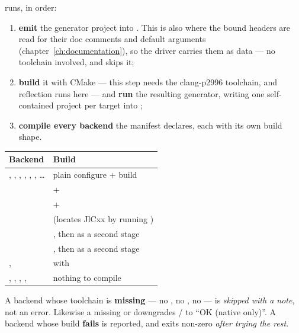runs, in order:

\begin{enumerate}
  \item \textbf{emit} the generator project into .
    This is also where the bound headers are read for their doc comments and
    default arguments (chapter~\ref{ch:documentation}), so the driver carries
    them as data --- no toolchain involved, and 
     skips it;
  \item \textbf{build} it with CMake --- this step needs the clang-p2996
    toolchain, and reflection runs here --- and \textbf{run} the resulting
    generator, writing one self-contained project per target into
    ;
  \item \textbf{compile every backend} the manifest declares, each with its own
    build shape.
\end{enumerate}

\begin{center}
\small
\begin{tabular}{@{}L{6.6cm}L{6.4cm}@{}}
\toprule
\textbf{Backend} & \textbf{Build} \\
\midrule
{}, , , , ,
  , \ldots & plain  configure + build \\
   &  +  \\
   &  +  \\
  &  (locates JlCxx by running ) \\
 & , then  as a second stage \\
   & , then  as a second stage \\
,  &  with  \\
, , , ,
   & nothing to compile \\
\bottomrule
\end{tabular}
\end{center}

A backend whose toolchain is \textbf{missing} --- no , no
, no  --- is \emph{skipped with a note}, not an error.
Likewise a missing  or  downgrades  /
 to ``OK (native only)''. A backend whose build \textbf{fails} is
reported, and  exits non-zero \emph{after trying the rest}.

